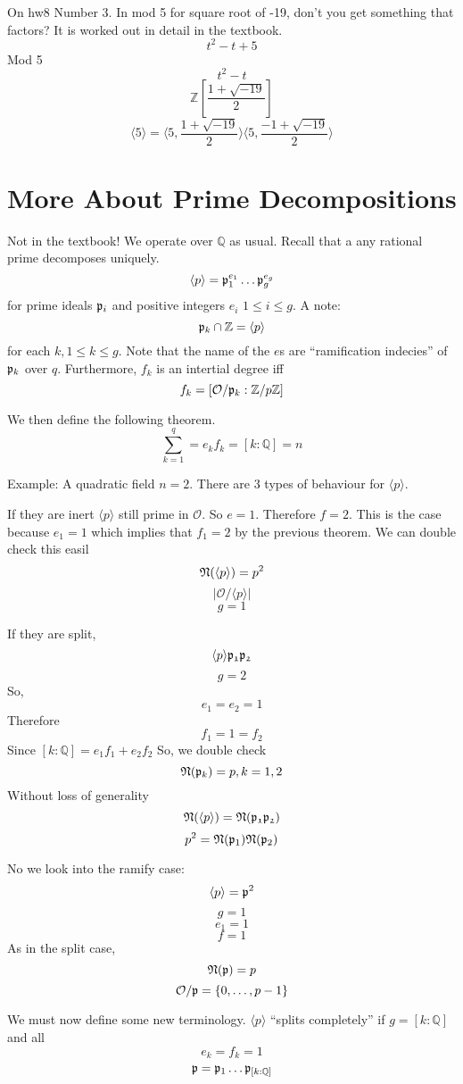 \documentclass{article}
\begin{document}
On hw8 Number 3. In mod 5 for square root of -19, don't you get something that
factors? It is worked out in detail in the textbook. 
\[ t^2 -t+5 \]
Mod 5
\[ t^2 -t  \]
\[ \mathbb{Z}[\frac{1+\sqrt{-19}}{2}] \]
\[ \langle 5 \rangle = \langle 5, \frac{1+\sqrt{-19}}{2} \rangle \langle 5,
\frac{-1+\sqrt{-19}}{2} \rangle \]

\section{More About Prime Decompositions}
Not in the textbook! We operate over $\mathbb{Q}$ as usual. Recall that a any
rational prime decomposes uniquely. 
\[ \langle p \rangle = \frak{p}_1^{e_1} \ldots \frak{p}_g^{e_g} \]
for prime ideals $\frak{p}_i$ and positive integers $e_i$ $1 \leq i \leq g$. A
note:
\[ \frak{p}_k \cap \mathbb{Z} = \langle p \rangle \]
for each $k, 1 \leq k \leq g$. Note that the name of the $e$s are ``ramification
indecies'' of $\frak{p}_k$ over $q$. Furthermore, $f_k$ is an intertial degree
iff
\[ f_k = [ \mathcal{O}/\frak{p}_k : \mathbb{Z} / p\mathbb{Z} ] \]


We then define the following theorem. 
\[ \sum_{k = 1}^q = e_k f_k = [ k:\mathbb{Q}] = n \]

Example: A quadratic field $n = 2$. There are 3 types of behaviour for $\langle
p \rangle $. 

If they are inert $\langle p \rangle$ still prime in $\mathcal{O}$. So
$e = 1$. Therefore $f = 2$. This is the case because $e_1 = 1$ which implies
that $f_1 = 2$ by the previous theorem. We can double check this easil
\[ \frak{N}(\langle p \rangle ) = p^2 \]
\[ | \mathcal{O}/\langle p \rangle | \]
\[ g = 1 \]

If they are split,
\[ \langle p \rangle \frak{p_1p_2} \]
\[ g = 2 \]
So, 
\[ e_1 = e_2 = 1 \]
Therefore
\[ f_1 = 1 = f_2 \]
Since $[ k : \mathbb{Q} ] = e_1 f_1 + e_2 f_2 $
So, we double check
\[ \frak{N}(\frak{p}_k) = p, k = 1,2 \]
Without loss of generality
\[ \frak{N}(\langle p \rangle ) = \frak{N}(\frak{p_1}\frak{p_2}) \]
\[ p^2  = \frak{N} (\frak{p}_1) \frak{N}(\frak{p}_2) \]

No we look into the ramify case:
\[ \langle p \rangle = \frak{p}^2 \]
\[ g = 1 \]
\[ e_1 = 1 \]
\[ f = 1 \]
As in the split case,
\[ \frak{N}(\frak{p}) = p \]
\[ \mathcal{O} / \frak{p} = \{ 0, \ldots, p-1 \} \]

We must now define some new terminology. $\langle p \rangle$ ``splits
completely'' if $g = [k:\mathbb{Q}]$ and all
\[ e_k = f_k = 1 \]
\[ \frak{p} = \frak{p}_1 \ldots \frak{p}_{[k:\mathbb{Q}]} \]
\end{document}
